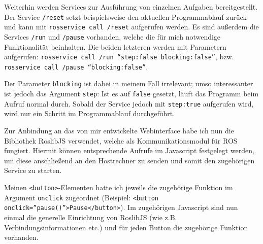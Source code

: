 Weiterhin werden Services zur Ausführung von einzelnen Aufgaben bereitgestellt.
Der Service \texttt{/reset} setzt beispielsweise den aktuellen Programmablauf
zurück und kann mit \texttt{rosservice call /reset} aufgerufen werden. Es sind
außerdem die Services \texttt{/run} und \texttt{/pause} vorhanden, welche die für
mich notwendige Funktionalität beinhalten. Die beiden letzteren werden mit Parametern
aufgerufen: \texttt{rosservice call /run ``step:false blocking:false''}, bzw.
\texttt{rosservice call /pause ``blocking:false''}.

Der Parameter \texttt{blocking} ist dabei in meinem Fall irrelevant; umso interessanter
ist jedoch das Argument \texttt{step}: Ist es auf \texttt{false} gesetzt, läuft
das Programm beim Aufruf normal durch. Sobald der Service jedoch mit \texttt{step:true}
aufgerufen wird, wird nur ein Schritt im Programmablauf durchgeführt.

Zur Anbindung an das von mir entwickelte Webinterface habe ich nun die Bibliothek
RoslibJS verwendet, welche als Kommunikationsmodul für ROS fungiert. Hiermit können
entsprechende Aufrufe im Javascript festgelegt werden, um diese anschließend an
den Hostrechner zu senden und somit den zugehörigen Service zu starten.

Meinen \texttt{<button>}-Elementen hatte ich jeweils die zugehörige Funktion im
Argument \texttt{onclick} zugeordnet (Beispiel: \texttt{<button onclick=''pause()''>Pause</button>}).
Im zugehörigen Javascript sind nun einmal die generelle Einrichtung von RoslibJS
(wie z.B. Verbindungsinformationen etc.) und für jeden Button die zugehörige Funktion
vorhanden.


